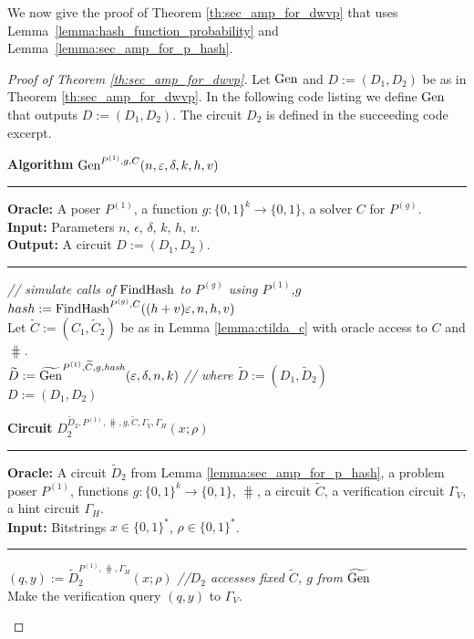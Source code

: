 %
We now give the proof of Theorem \ref{th:sec_amp_for_dwvp} that uses Lemma~\ref{lemma:hash_function_probability} and Lemma~\ref{lemma:sec_amp_for_p_hash}.
%
\begin{proof}[Proof of Theorem \ref{th:sec_amp_for_dwvp}]
  Let $\operatorname{\text{Gen}}$ and $D := (D_1, D_2)$ be as in Theorem \ref{th:sec_amp_for_dwvp}.
  In the following code listing we define $\operatorname{\text{Gen}}$ that outputs $D := (D_1, D_2)$.
  The circuit $D_2$ is defined in the succeeding code excerpt.
%
\begin{codeblock}
  \textbf{Algorithm} $\operatorname{\text{Gen}}^{P^{(1)}, g, C}(n, \varepsilon, \delta, k, h, v)$
  \medskip\hrule
  \textbf{Oracle:} A poser $P^{(1)}$, a function $g: \{0,1\}^{k} \rightarrow \{0,1\}$, a solver $C$ for $P^{(g)}$.  \\
  \textbf{Input:} Parameters $n$, $\epsilon$, $\delta$, $k$, $h$, $v$.\\
  \textbf{Output:} A circuit $D := (D_1, D_2)$.
  \medskip\hrule
  \textit{// simulate calls of $\operatorname{\text{FindHash}}$ to $P^{(g)}$ using $P^{(1)}$,$g$} \\
  $hash := \operatorname{\text{FindHash}}^{P^{(g)}, C}((h+v)\varepsilon, n, h, v)$ \\
  Let $\widetilde{C} := (C_1, \widetilde{C}_2)$ be as in Lemma \ref{lemma:ctilda_c} with oracle access to $C$ and $\hash$. \\
  $\widetilde{D} := \widetilde{\operatorname{\text{Gen}}}^{P^{(1)},  \widetilde{C},  g, \operatorname{\mathit{hash}}}(\varepsilon, \delta, n, k)$ \textit{// where $\widetilde{D} := (D_1, \widetilde{D}_2)$}\\
  \Return $D := (D_1, D_2)$
\end{codeblock}
%
\begin{codeblock}
  \textbf{Circuit} $D_2^{\widetilde{D}_2, P^{(1)}, \hash, g, \widetilde{C}, \Gamma_V, \Gamma_H}(x; \rho)$
  \medskip \hrule
  \textbf{Oracle:} A circuit $\widetilde{D}_2$ from Lemma \ref{lemma:sec_amp_for_p_hash}, a problem poser $P^{(1)}$,
  functions $g: \{0,1\}^{k} \rightarrow \{0,1\}$, $\hash$, a circuit $\widetilde{C}$, a verification circuit $\Gamma_V$, a hint circuit $\Gamma_H$.\\
  \textbf{Input:}  Bitstrings $x \in \{0,1\}^{*}$, $\rho \in \{0,1\}^{*}$.
  \medskip\hrule
  $(q, y) := \widetilde{D}_2^{P^{(1)}, \hash, \Gamma_H}(x; \rho)$ \textit{//$D_2$ accesses fixed  $\widetilde{C}$, $g$ from $\widetilde{\operatorname{\text{Gen}}}$} \\
  Make the verification query $(q,y)$ to $\Gamma_V$.

\end{codeblock}
\end{proof}
